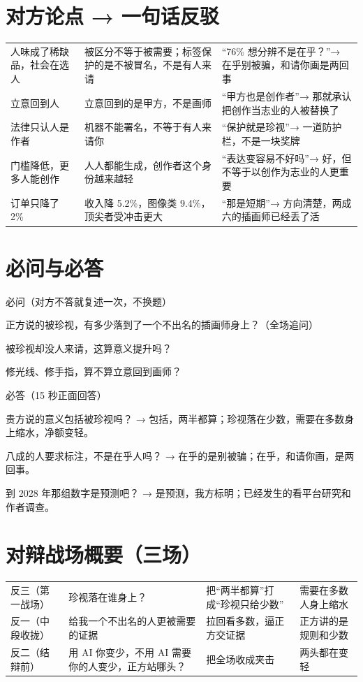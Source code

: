 \documentclass[quick,con]{debate}
\begin{document}
\section{对方论点 → 一句话反驳}
\begin{tabularx}{\linewidth}{@{}Y Y Y@{}}\toprule
{}&&\\\midrule
人味成了稀缺品，社会在选人&被区分不等于被需要；标签保护的是不被冒名，不是有人来请&“76\% 想分辨不是在乎？”→ 在乎别被骗，和请你画是两回事\\
立意回到人&立意回到的是甲方，不是画师&“甲方也是创作者”→ 那就承认把创作当志业的人被替换了\\
法律只认人是作者&机器不能署名，不等于有人来请你&“保护就是珍视”→ 一道防护栏，不是一块奖牌\\
门槛降低，更多人能创作&人人都能生成，创作者这个身份越来越轻&“表达变容易不好吗”→ 好，但不等于以创作为志业的人更重要\\
订单只降了 2\%&收入降 5.2\%，图像类 9.4\%，顶尖者受冲击更大&“那是短期”→ 方向清楚，两成六的插画师已经丢了活\\
\bottomrule\end{tabularx}

\section{必问与必答}
\begin{points}{必问（对方不答就复述一次，不换题）}
\item 正方说的被珍视，有多少落到了一个不出名的插画师身上？（全场追问）
\item 被珍视却没人来请，这算意义提升吗？
\item 修光线、修手指，算不算立意回到画师？
\end{points}
\begin{points}{必答（15 秒正面回答）}
\item 贵方说的意义包括被珍视吗？ → 包括，两半都算；珍视落在少数，需要在多数身上缩水，净额变轻。
\item 八成的人要求标注，不是在乎人吗？ → 在乎的是别被骗；在乎，和请你画，是两回事。
\item 到 2028 年那组数字是预测吧？ → 是预测，我方标明；已经发生的看平台研究和作者调查。
\end{points}

\section{对辩战场概要（三场）}
\begin{tabularx}{\linewidth}{@{}L{5.4em}Y Y Y@{}}\toprule
{}&&&\\\midrule
反三（第一战场）&珍视落在谁身上？&把“两半都算”打成“珍视只给少数”&需要在多数人身上缩水\\
反一（中段收拢）&给我一个不出名的人更被需要的证据&拉回看多数，逼正方交证据&正方讲的是规则和少数\\
反二（结辩前）&用 AI 你变少，不用 AI 需要你的人变少，正方站哪头？&把全场收成夹击&两头都在变轻\\
\bottomrule\end{tabularx}
\end{document}
